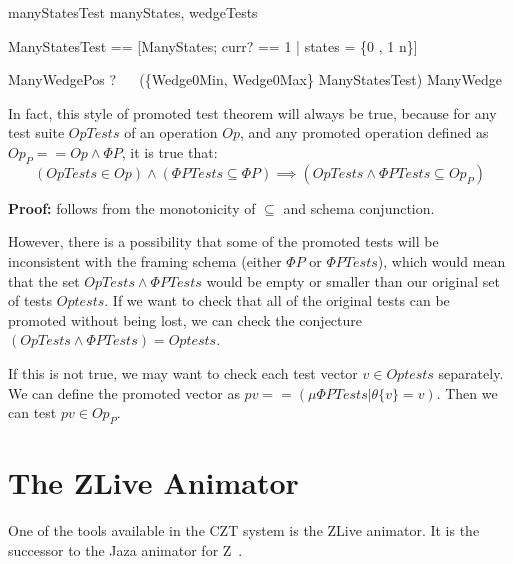 \documentclass{llncs}
\begin{document}
\begin{zsection}
  \SECTION manyStatesTest \parents manyStates, wedgeTests
\end{zsection}

\begin{zed}
  \Phi ManyStatesTest ==
    [\Phi ManyStates; curr? == 1 | states = \{0 , 1 \mapsto n\}]
\end{zed}

\begin{theorem}{ManyWedgePos}
  \vdash? ~~ (\{Wedge0Min, Wedge0Max\} \land \Phi ManyStatesTest)
      \subseteq ManyWedge
\end{theorem}

In fact, this style of promoted test theorem will always be true,
because for any test suite $OpTests$ of an operation $Op$,
and any promoted operation defined as $Op_P == Op \land \Phi P$,
it is true that:
\[
   (OpTests \in Op) \land (\Phi PTests \subseteq \Phi P)
   \implies (OpTests \land \Phi PTests \subseteq Op_P)
\]

\textbf{Proof:} follows from the monotonicity of $\subseteq$ and schema
conjunction.

However, there is a possibility that some of the promoted tests
will be inconsistent with the framing schema (either $\Phi P$ or $\Phi
PTests$), which would mean that the set $OpTests \land \Phi PTests$
would be empty or smaller than our original set of tests $Optests$.
If we want to check that all of the original tests can be promoted without
being lost, we can check the conjecture 
$(OpTests \land \Phi PTests) = Optests$.

If this is not true, we may want to check each test vector $v \in Optests$
separately.  We can define the promoted vector as 
$pv == (\mu \Phi PTests | \theta \{v\} = v)$.
Then we can test $pv \in Op_P$. 



\section{The ZLive Animator}

One of the tools available in the CZT system is the ZLive animator.
It is the successor to the Jaza animator for Z~\cite{utting:jaza}.
\end{document}
